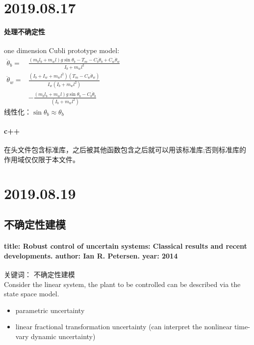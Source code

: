 \documentclass[UTF8,a4paper]{ctexart}
\begin{document}
\section{2019.08.17}
\paragraph{处理不确定性}
one dimension Cubli prototype model:\\
$\begin{aligned} \ddot{\theta}_{b}=& \frac{\left(m_{b} l_{b}+m_{w} l\right) g \sin \theta_{b}-T_{m}-C_{b} \dot{\theta}_{b}+C_{w} \dot{\theta}_{w}}{I_{b}+m_{w} l^{2}} \\ \ddot{\theta}_{w}=& \frac{\left(I_{b}+I_{w}+m_{w} l^{2}\right)\left(T_{m}-C_{w} \dot{\theta}_{w}\right)}{I_{w}\left(I_{b}+m_{w} l^{2}\right)} \\ &-\frac{\left(m_{b} l_{b}+m_{w} l\right) g \sin \theta_{b}-C_{b} \dot{\theta}_{b}}{\left(I_{b}+m_{w} l^{2}\right)} \end{aligned}$\\
线性化：$\sin\theta_b \approx \theta_b$
\paragraph{c++}
在头文件包含标准库，之后被其他函数包含之后就可以用该标准库;否则标准库的作用域仅仅限于本文件。\\
\section{2019.08.19}
\subsection{不确定性建模}
\paragraph{title: Robust control of uncertain systems: Classical results and
recent developments. author: Ian R. Petersen. year: 2014}
关键词： 不确定性建模\\
Consider the linear system, the plant to be controlled can be described via the state space model.
\begin{itemize}
\item parametric uncertainty
\item linear fractional transformation uncertainty (can interpret the nonlinear time-vary dynamic uncertainty)
\end{itemize}
\end{document}

